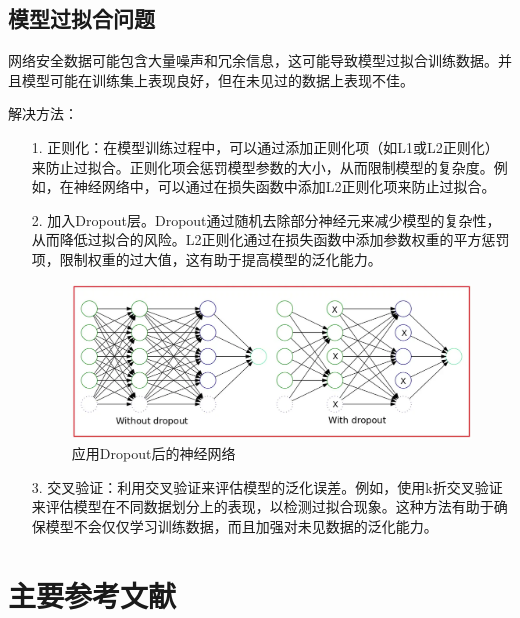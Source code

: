 \subsection{模型过拟合问题}
网络安全数据可能包含大量噪声和冗余信息，这可能导致模型过拟合训练数据。并且模型可能在训练集上表现良好，但在未见过的数据上表现不佳。

解决方法：
\begin{itemize}
    \item[1.] 正则化：在模型训练过程中，可以通过添加正则化项（如L1或L2正则化）来防止过拟合。正则化项会惩罚模型参数的大小，从而限制模型的复杂度\cite{10533733}。例如，在神经网络中，可以通过在损失函数中添加L2正则化\cite{10.1145/2347736.2347755}项来防止过拟合。\item[2.]加入Dropout层\cite{Cai2019EffectiveAE}。Dropout通过随机去除部分神经元来减少模型的复杂性，从而降低过拟合的风险。L2正则化通过在损失函数中添加参数权重的平方惩罚项，限制权重的过大值，这有助于提高模型的泛化能力。
        \begin{figure}[htbp]
            \centering
            \includegraphics[width=.9\textwidth]{./img/dropout.png}
            \caption{应用Dropout后的神经网络}\label{img2}
        \end{figure}
    \item[3.] 交叉验证：利用交叉验证来评估模型的泛化误差。例如，使用k折交叉验证\cite{10533733}来评估模型在不同数据划分上的表现，以检测过拟合现象。这种方法有助于确保模型不会仅仅学习训练数据，而且加强对未见数据的泛化能力​。
\end{itemize}

\section{主要参考文献}



